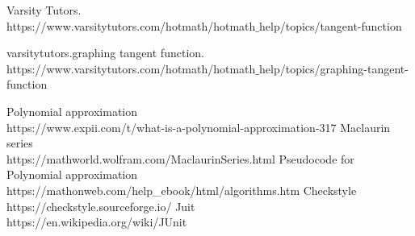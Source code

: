 \documentclass[letterpaper, 11pt]{report}
\begin{document}
\begin{thebibliography}{}
Varsity Tutors.
\\https://www.varsitytutors.com/hotmath/hotmath$\_$help/topics/tangent-function

varsitytutors.graphing tangent function. 
\\https://www.varsitytutors.com/hotmath/hotmath$\_$help/topics/graphing-tangent-function

Polynomial approximation
\\https://www.expii.com/t/what-is-a-polynomial-approximation-317
Maclaurin series
\\https://mathworld.wolfram.com/MaclaurinSeries.html
Pseudocode for Polynomial approximation\\https://mathonweb.com/help\_ebook/html/algorithms.htm
Checkstyle\\
https://checkstyle.sourceforge.io/
Juit\\
https://en.wikipedia.org/wiki/JUnit
\end{thebibliography}
\end{document}
